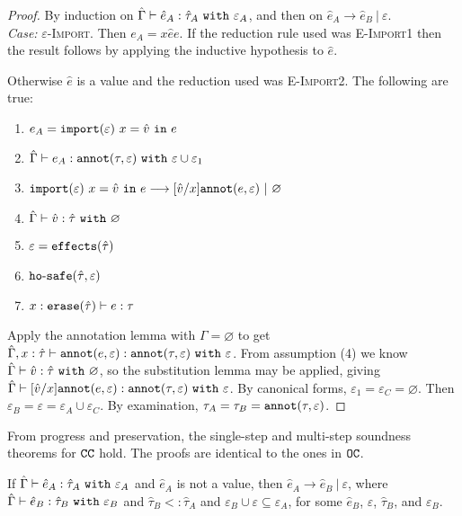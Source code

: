 \begin{proof} By induction on $\hat \Gamma \vdash \hat e_A: \hat \tau_A~\mathtt{with}~ \varepsilon_A$, and then on $\hat e_A \longrightarrow \hat e_B~|~\varepsilon$. \\

\textit{Case:} \textsc{$\varepsilon$-Import}. Then $e_A = {x}{\hat e}{e}$. If the reduction rule used was \textsc{E-Import1} then the result follows by applying the inductive hypothesis to $\hat e$.

Otherwise $\hat e$ is a value and the reduction used was \textsc{E-Import2}. The following are true:
\begin{enumerate}
	\setlength\itemsep{-0.7em}
	\item $e_A = \mathtt{import}(\varepsilon)~x = \hat v~\mathtt{in}~ e$
	\item $\hat \Gamma \vdash e_A: \mathtt{annot}(\tau, \varepsilon)~\mathtt{with}~ \varepsilon \cup \varepsilon_1$
	\item $\mathtt{import}(\varepsilon)~x = \hat v~\mathtt{in}~ e \longrightarrow [\hat v/x]\mathtt{annot}(e, \varepsilon)~|~\varnothing$
	\item $\hat \Gamma \vdash \hat v: \hat \tau~\mathtt{with}~ \varnothing$
	\item $\varepsilon = \mathtt{effects}(\hat \tau)$
	\item $\mathtt{ho \hbox{-} safe}(\hat \tau, \varepsilon)$
	\item $x: \mathtt{erase}(\hat \tau) \vdash e: \tau$
\end{enumerate}

\noindent
Apply the annotation lemma with $\Gamma = \varnothing$ to get $\hat \Gamma, x: \hat \tau \vdash \mathtt{annot}(e, \varepsilon): \mathtt{annot}(\tau, \varepsilon)~\mathtt{with}~ \varepsilon$. From assumption (4) we know $\hat \Gamma \vdash \hat v: \hat \tau~\mathtt{with}~ \varnothing$, so the substitution lemma may be applied, giving $\hat \Gamma \vdash [\hat v/x]\mathtt{annot}(e, \varepsilon): \mathtt{annot}(\tau, \varepsilon)~\mathtt{with}~ \varepsilon$. By canonical forms, $\varepsilon_1 = \varepsilon_C = \varnothing$. Then $\varepsilon_B = \varepsilon = \varepsilon_A \cup \varepsilon_C$. By examination, $\tau_A = \tau_B = \mathtt{annot}(\tau, \varepsilon)$.
\end{proof}

From progress and preservation, the single-step and multi-step soundness theorems for $\mathtt{CC}$ hold. The proofs are identical to the ones in $\mathtt{OC}$.

\begin{theorem}
If $\hat \Gamma \vdash \hat e_A: \hat \tau_A~\mathtt{with}~ \varepsilon_A$ and $\hat e_A$ is not a value, then $\hat e_A \longrightarrow \hat e_B~|~\varepsilon$, where $\hat \Gamma \vdash \hat e_B: \hat \tau_B~\mathtt{with}~ \varepsilon_B$ and $\hat \tau_B <: \hat \tau_A$ and $\varepsilon_B \cup \varepsilon \subseteq \varepsilon_A$, for some $\hat e_B$, $\varepsilon$, $\hat \tau_B$, and $\varepsilon_B$.
\end{theorem}

